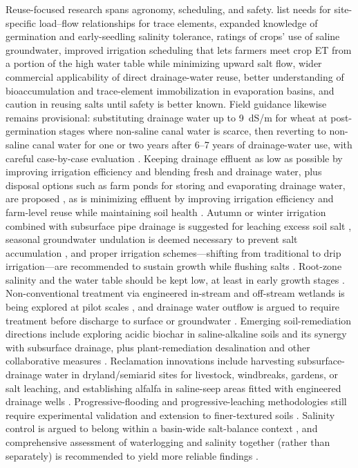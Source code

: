 Reuse-focused research spans agronomy, scheduling, and safety. \textcite{WESTCOT1988} list needs for site-specific load--flow relationships for trace elements, expanded knowledge of germination and early-seedling salinity tolerance, ratings of crops' use of saline groundwater, improved irrigation scheduling that lets farmers meet crop ET from a portion of the high water table while minimizing upward salt flow, wider commercial applicability of direct drainage-water reuse, better understanding of bioaccumulation and trace-element immobilization in evaporation basins, and caution in reusing salts until safety is better known. Field guidance likewise remains provisional: substituting drainage water up to 9~dS/m for wheat at post-germination stages where non-saline canal water is scarce, then reverting to non-saline canal water for one or two years after 6--7 years of drainage-water use, with careful case-by-case evaluation \parencite{Sharma1998}. Keeping drainage effluent as low as possible by improving irrigation efficiency and blending fresh and drainage water, plus disposal options such as farm ponds for storing and evaporating drainage water, are proposed \parencite{Datta2002}, as is minimizing effluent by improving irrigation efficiency and farm-level reuse while maintaining soil health \parencite{Qureshi2008}. Autumn or winter irrigation combined with subsurface pipe drainage is suggested for leaching excess soil salt \parencite{Dou2022}, seasonal groundwater undulation is deemed necessary to prevent salt accumulation \parencite{Mirlas2021}, and proper irrigation schemes---shifting from traditional to drip irrigation---are recommended to sustain growth while flushing salts \parencite{Mirlas2021}. Root-zone salinity and the water table should be kept low, at least in early growth stages \parencite{Singh2019}. Non-conventional treatment via engineered in-stream and off-stream wetlands is being explored at pilot scales \parencite{AbdelDayem2007}, and drainage water outflow is argued to require treatment before discharge to surface or groundwater \parencite{Filipovic2015}. Emerging soil-remediation directions include exploring acidic biochar in saline-alkaline soils and its synergy with subsurface drainage, plus plant-remediation desalination and other collaborative measures \parencite{Liu2025f}. Reclamation innovations include harvesting subsurface-drainage water in dryland/semiarid sites for livestock, windbreaks, gardens, or salt leaching, and establishing alfalfa in saline-seep areas fitted with engineered drainage wells \parencite{Steppuhn2017}. Progressive-flooding and progressive-leaching methodologies still require experimental validation and extension to finer-textured soils \parencite{Youngs2000}. Salinity control is argued to belong within a basin-wide salt-balance context \parencite{Qureshi2008}, and comprehensive assessment of waterlogging and salinity together (rather than separately) is recommended to yield more reliable findings \parencite{Valipour2014}.

